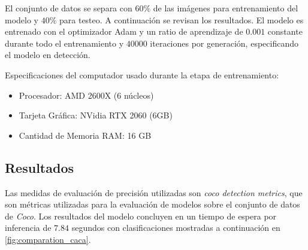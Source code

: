 \documentclass[letter,12pt]{report}
\begin{document}
El conjunto de datos se separa con $60\%$ de las imágenes para entrenamiento del modelo y
$40\%$ para testeo. A continuación se revisan los resultados. El modelo es entrenado con el
optimizador Adam y un ratio de aprendizaje de $0.001$ constante durante todo el entrenamiento
y $40000$ iteraciones por generación, especificando el modelo en detección.

Especificaciones del computador usado durante la etapa de entrenamiento:

\begin{itemize}
    \item Procesador: AMD 2600X (6 núcleos)
    \item Tarjeta Gráfica: NVidia RTX 2060 (6GB)
    \item Cantidad de Memoria RAM: 16 GB
\end{itemize}

\subsection{Resultados}
Las medidas de evaluación de precisión utilizadas son \textit{coco detection metrics},
que son métricas utilizadas para la evaluación de modelos sobre el conjunto de datos de
\textit{Coco}. Los resultados del modelo concluyen en un tiempo de espera por inferencia
de $7.84$ segundos con clasificaciones mostradas a continuación en \ref{fig:comparation_caca}.
\end{document}
